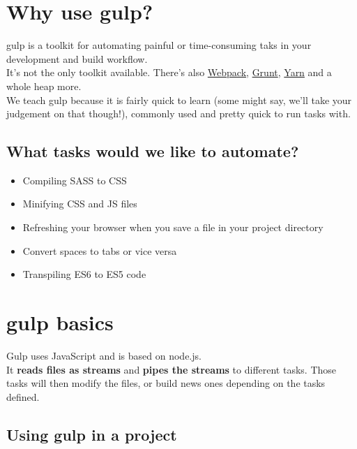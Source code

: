 \section{Why use gulp?}

gulp is a toolkit for automating painful or time-consuming taks in your development and build workflow.
\\

It's not the only toolkit available. There's also \href{https://webpack.js.org/}{Webpack}, \href{https://gruntjs.com/}{Grunt}, \href{https://yarnpkg.com/}{Yarn} and a whole heap more.
\\

We teach gulp because it is fairly quick to learn (some might say, we'll take your judgement on that though!), commonly used and pretty quick to run tasks with.
\\

\subsection{What tasks would we like to automate?}

\begin{itemize}
    \item Compiling SASS to CSS
	\item Minifying CSS and JS files
	\item Refreshing your browser when you save a file in your project directory
	\item Convert spaces to tabs or vice versa
	\item Transpiling ES6 to ES5 code
\end{itemize}


\section{gulp basics}

Gulp uses JavaScript and is based on node.js.
\\

It \textbf{reads files as streams} and \textbf{pipes the streams} to different tasks. Those tasks will then modify the files, or build news ones depending on the tasks defined.
\\

\subsection{Using gulp in a project}

